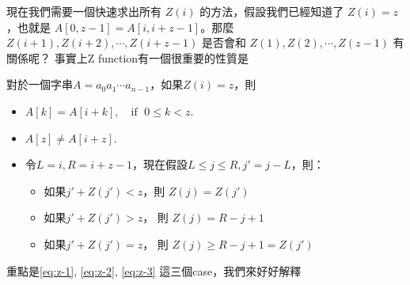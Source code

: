 \documentclass[a4paper,12pt]{book}
\begin{document}
現在我們需要一個快速求出所有 $Z(i)$ 的方法，假設我們已經知道了 $Z(i) = z$，也就是 $A[0, z-1] = A[i, i+z-1]$。那麼 $Z(i+1), Z(i+2), \cdots , Z(i+z-1)$ 是否會和 $Z(1), Z(2), \cdots, Z(z-1)$ 有關係呢？
事實上Z function有一個很重要的性質是
\begin{theorem}[定理]
  對於一個字串$A = a_0 a_1 \cdots a_{n-1}$，如果$Z(i) = z$，則
  \begin{itemize}
    \item $A[k] = A[i+k], \quad \text{if } \; 0 \leq k < z$.
    \item $A[z] \neq A[i+z]$. \listeqn \label{eq:z-0}
    \item 令$L = i, R = i + z - 1$，現在假設$L \leq j \leq R, j' = j - L$，則：
      \begin{itemize}
        \item 如果$j' + Z(j') < z $，則 $Z(j) = Z(j')$ \listeqn \label{eq:z-1}
        \item 如果$j' + Z(j') > z$， 則 $Z(j) = R - j + 1$ \listeqn \label{eq:z-2}
        \item 如果$j' + Z(j') = z$， 則 $Z(j) \geq R - j + 1 = Z(j')$ \listeqn \label{eq:z-3}
      \end{itemize}
  \end{itemize}
\end{theorem}
重點是\eqref{eq:z-1}, \eqref{eq:z-2}, \eqref{eq:z-3} 這三個case，我們來好好解釋
\end{document}
